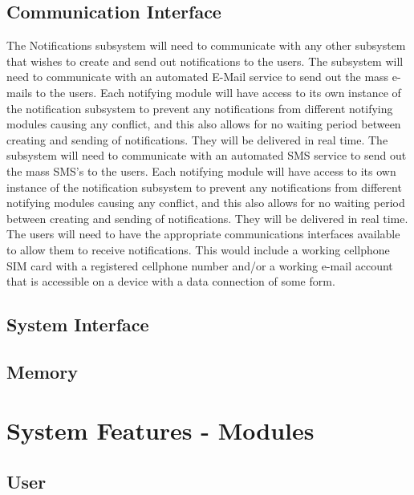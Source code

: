\documentclass{article}
\begin{document}
\subsection{Communication Interface}
The Notifications subsystem will need to communicate with any other subsystem that wishes to create and send out notifications to the users.
The subsystem will need to communicate with an automated E-Mail service to send out the mass e-mails to the users. Each notifying module will have access to its own instance of the notification subsystem to prevent any notifications from different notifying modules causing any conflict, and this also allows for no waiting period between creating and sending of notifications. They will be delivered in real time.
The subsystem will need to communicate with an automated SMS service to send out the mass SMS's to the users. Each notifying module will have access to its own instance of the notification subsystem to prevent any notifications from different notifying modules causing any conflict, and this also allows for no waiting period between creating and sending of notifications. They will be delivered in real time.
The users will need to have the appropriate communications interfaces available to allow them to receive notifications. This would include a working cellphone SIM card with a registered cellphone number and/or a working e-mail account that is accessible on a device with a data connection of some form.

\subsection{System Interface}

\subsection{Memory}

\newpage
\section{System Features - Modules}

\subsection{User}
\end{document}
